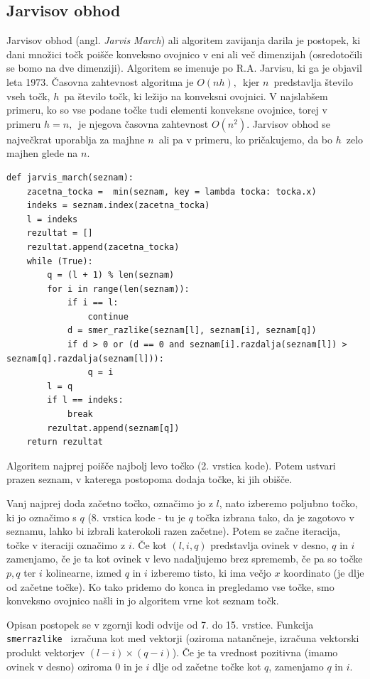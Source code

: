 \documentclass[a4paper]{article}
\begin{document}
\subsection{Jarvisov obhod}
Jarvisov obhod (angl. \textit{Jarvis March}) ali algoritem zavijanja darila je postopek, ki dani množici točk poišče konveksno ovojnico v eni ali več dimenzijah (osredotočili se 
bomo na dve dimenziji). Algoritem se imenuje po R.A. Jarvisu, ki ga je objavil leta 1973. Časovna zahtevnost algoritma je $O(nh),$~kjer $n$~predstavlja število vseh točk, $h$~pa 
število točk, ki ležijo na konveksni ovojnici. V najslabšem primeru, ko so vse podane točke tudi elementi konveksne ovojnice, torej v primeru $h = n,$~je njegova časovna zahtevnost 
$O(n^2)$. Jarvisov obhod se največkrat uporablja za majhne $n$~ali pa v primeru, ko pričakujemo, da bo $h$~zelo majhen glede na $n$.

\begin{lstlisting}
def jarvis_march(seznam):
    zacetna_tocka =  min(seznam, key = lambda tocka: tocka.x)
    indeks = seznam.index(zacetna_tocka) 
    l = indeks
    rezultat = []
    rezultat.append(zacetna_tocka)
    while (True):
        q = (l + 1) % len(seznam)      
        for i in range(len(seznam)):
            if i == l:
                continue
            d = smer_razlike(seznam[l], seznam[i], seznam[q])
            if d > 0 or (d == 0 and seznam[i].razdalja(seznam[l]) > seznam[q].razdalja(seznam[l])):
                q = i
        l = q
        if l == indeks:
            break    
        rezultat.append(seznam[q])
    return rezultat
\end{lstlisting}

Algoritem najprej poišče najbolj levo točko (2. vrstica kode). Potem ustvari prazen seznam, v katerega postopoma dodaja točke, ki jih obišče. 

Vanj najprej doda začetno točko, označimo jo z $l$, nato izberemo poljubno točko, ki jo označimo s $q$ (8. vrstica kode - tu je $q$ točka izbrana tako, da je zagotovo v seznamu, 
lahko bi izbrali katerokoli razen začetne). Potem se začne iteracija, točke v iteraciji označimo z $i$. Če kot $(l,i,q)$ predstavlja ovinek v desno, $q$ in $i$ zamenjamo,
če je ta kot ovinek v levo nadaljujemo brez sprememb, če pa so točke $p,q$ ter $i$ kolinearne, izmed $q$ in $i$ izberemo tisto, ki ima večjo $x$ koordinato
(je dlje od začetne točke). Ko tako pridemo do konca in pregledamo vse točke, smo konveksno ovojnico našli in jo algoritem vrne kot seznam točk. 

Opisan postopek se v zgornji kodi odvije od 7. do 15. vrstice. Funkcija \texttt{ smer\textunderscore razlike } izračuna kot med vektorji 
(oziroma natančneje, izračuna vektorski produkt vektorjev $(l - i)\times(q - i)$). Če je ta vrednost pozitivna (imamo ovinek v desno) oziroma 0 in je $i$ dlje od začetne točke kot $q$, zamenjamo $q$ in $i$. 
\end{document}
